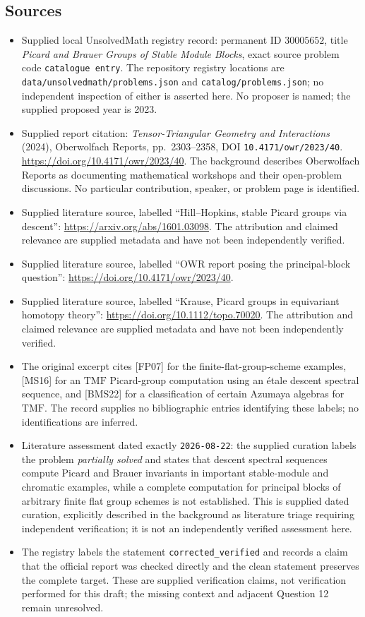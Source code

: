 \documentclass[11pt]{article}
\begin{document}
\subsection{Sources}
\begin{itemize}
\item Supplied local UnsolvedMath registry record: permanent ID \(30005652\), title \emph{Picard and Brauer Groups of Stable Module Blocks}, exact source problem code \texttt{catalogue entry}. The repository registry locations are \texttt{data/unsolvedmath/problems.json} and \texttt{catalog/problems.json}; no independent inspection of either is asserted here. No proposer is named; the supplied proposed year is 2023.
\item Supplied report citation: \emph{Tensor-Triangular Geometry and Interactions} (2024), Oberwolfach Reports, pp.\ 2303--2358, DOI \texttt{10.4171/owr/2023/40}. \url{https://doi.org/10.4171/owr/2023/40}. The background describes Oberwolfach Reports as documenting mathematical workshops and their open-problem discussions. No particular contribution, speaker, or problem page is identified.
\item Supplied literature source, labelled ``Hill--Hopkins, stable Picard groups via descent'': \url{https://arxiv.org/abs/1601.03098}. The attribution and claimed relevance are supplied metadata and have not been independently verified.
\item Supplied literature source, labelled ``OWR report posing the principal-block question'': \url{https://doi.org/10.4171/owr/2023/40}.
\item Supplied literature source, labelled ``Krause, Picard groups in equivariant homotopy theory'': \url{https://doi.org/10.1112/topo.70020}. The attribution and claimed relevance are supplied metadata and have not been independently verified.
\item The original excerpt cites [FP07] for the finite-flat-group-scheme examples, [MS16] for an \(\mathrm{TMF}\) Picard-group computation using an \'etale descent spectral sequence, and [BMS22] for a classification of certain Azumaya algebras for \(\mathrm{TMF}\). The record supplies no bibliographic entries identifying these labels; no identifications are inferred.
\item Literature assessment dated exactly \texttt{2026-08-22}: the supplied curation labels the problem \emph{partially solved} and states that descent spectral sequences compute Picard and Brauer invariants in important stable-module and chromatic examples, while a complete computation for principal blocks of arbitrary finite flat group schemes is not established. This is supplied dated curation, explicitly described in the background as literature triage requiring independent verification; it is not an independently verified assessment here.
\item The registry labels the statement \texttt{corrected\_verified} and records a claim that the official report was checked directly and the clean statement preserves the complete target. These are supplied verification claims, not verification performed for this draft; the missing context and adjacent Question 12 remain unresolved.
\end{itemize}
\end{document}
